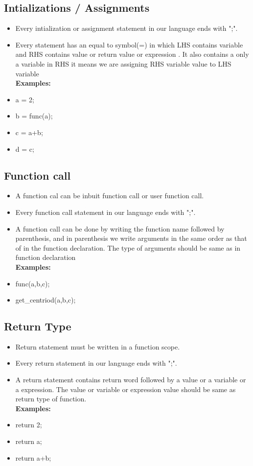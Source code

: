 \documentclass[12pt]{article}
\begin{document}
\subsection{Intializations / Assignments}
\begin{itemize}
    \item Every intialization or assignment statement in our language ends with ";".
    \item Every statement has an equal to symbol(=) in which LHS contains variable and RHS contains  value or return value or expression . It also contains a only a variable in RHS it means we are assigning RHS variable value to LHS variable  \\
    \textbf{Examples:}
    \item a = 2;
    \item b = func(a);
    \item c = a+b;
    \item d = c;
\end{itemize}


\subsection{Function call}
\begin{itemize}
    \item A function cal can be inbuit function call or user function call.
    \item Every function call statement in our language ends with ";".
   \item A function call can be done by writing the function name  followed by parenthesis, and in parenthesis we write arguments in the same order as that of in the function declaration. The type of arguments should be same as in function declaration\\
   \textbf{Examples:}
   \item func(a,b,c);
   \item get\_centriod(a,b,c);
   
\end{itemize}
\subsection{Return Type}
\begin{itemize}
    \item Return statement must be written in a function scope.
    \item Every return statement in our language ends with ";".
   \item A return statement contains return word followed by a value or a variable or a expression. The value or variable or expression value should be same as return type of function.\\
   \textbf{Examples:}
   \item return 2;
   \item return a;
   \item return a+b;
   
\end{itemize}
\end{document}
